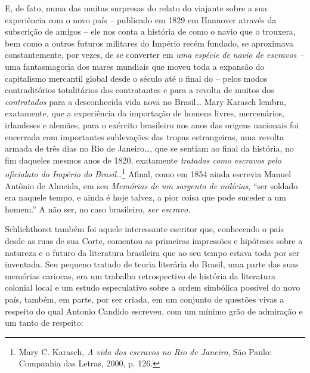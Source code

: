 E, de fato, numa das muitas surpresas do relato do viajante sobre a sua
experiência com o novo país -- publicado em 1829 em Hannover através da
subscrição de amigos -- ele nos conta a história de como o navio que o
trouxera, bem como a outros futuros militares do Império recém fundado,
se aproximava constantemente, por vezes, de se converter em \emph{uma}
\emph{espécie} \emph{de} \emph{navio de escravos --} uma fantasmagoria
dos mares mundiais que moveu toda a expansão do capitalismo mercantil
global desde o século  até o final do  -- pelos modos
contraditórios totalitários dos contratantes e para a revolta de muitos
dos \emph{contratados} para a desconhecida vida nova no Brasil\emph{\ldots{}}
Mary Karasch lembra, exatamente, que a experiência da importação de
homens livres, mercenários, irlandeses e alemães, para o exército
brasileiro nos anos das origens nacionais foi encerrada com importantes
sublevações das tropas estrangeiras, uma revolta armada de três dias no
Rio de Janeiro\ldots{}, que se sentiam ao final da história, no fim daqueles
mesmos anos de 1820, exatamente \emph{tratadas como escravos pelo
oficialato do Império do Brasil}\ldots{}\footnote{Mary C. Karasch, \emph{A
  vida dos escravos no Rio de Janeiro}, São Paulo: Companhia das Letras,
  2000, p. 126.} Afinal, como em 1854 ainda escrevia Manuel Antônio de
Almeida, em seu \emph{Memórias de um sargento de milícias}, ``ser
soldado era naquele tempo, e ainda é hoje talvez, a pior coisa que pode
suceder a um homem.'' A não ser, no caso brasileiro, \emph{ser escravo.}

Schlichthorst também foi aquele interessante escritor que, conhecendo o
país desde as ruas de sua Corte, comentou as primeiras impressões e
hipóteses sobre a natureza e o futuro da literatura brasileira que ao
seu tempo estava toda por ser inventada. Seu pequeno tratado de teoria
literária do Brasil, uma parte das suas memórias cariocas, era um
trabalho retrospectivo de história da literatura colonial local e um
estudo especulativo sobre a ordem simbólica possível do novo país,
também, em parte, por ser criada, em um conjunto de questões vivas a
respeito do qual Antonio Candido escreveu, com um mínimo grão de
admiração e um tanto de respeito: 

